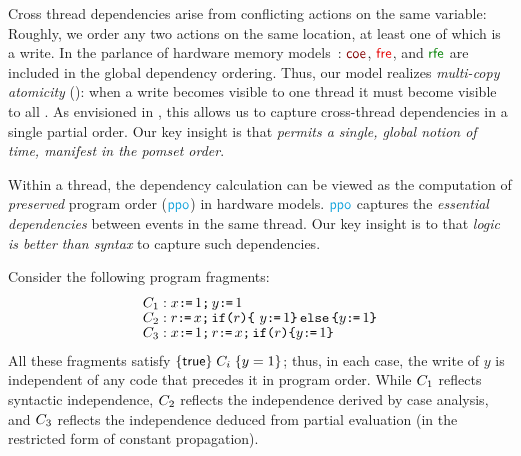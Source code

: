 Cross thread dependencies arise from conflicting actions on the same
variable: Roughly, we order any two actions on the same location, at least
one of which is a write.  In the parlance of hardware memory
models~\citep{alglave}: $\rcoe$, $\rfre$, and $\rrfex$ are included in the
global dependency ordering.  Thus, our model realizes \emph{multi-copy
  atomicity} (\mca): when a write becomes visible to one thread it must
become visible to all
\citep{DBLP:journals/pacmpl/PulteFDFSS18}.  As envisioned in
\cite[]{AlglaveThesis}, this allows us to capture cross-thread
dependencies in a single partial order.  Our key insight is that \emph{\mca{}
  permits a single, global notion of time, manifest in the pomset order}.
  

Within a thread, the dependency calculation can be viewed as the computation
of \emph{preserved} program order ($\rppo$) in hardware models.  $\rppo$
captures the \emph{essential dependencies} between events in the same thread.
Our key insight is to that \emph{logic is better than syntax} to capture such
dependencies.

Consider the following program fragments: \begingroup \allowdisplaybreaks
\begin{align*}
  & C_1: x \texttt{:}\mkern-1mu\texttt{=}\, 1 \texttt{;}\,\allowbreak y \texttt{:}\mkern-1mu\texttt{=}\, 1
  \\[-1ex] & C_2: r \texttt{:}\mkern-1mu\texttt{=}\, x \texttt{;}\,\allowbreak \texttt{if}\allowbreak\texttt{(}r\texttt{)} \allowbreak\texttt{\{}\ y \texttt{:}\mkern-1mu\texttt{=}\, 1 \texttt{\}}\,\allowbreak\texttt{else}\allowbreak\,\texttt{\{} y \texttt{:}\mkern-1mu\texttt{=}\, 1  \texttt{\}}
  \\[-1ex] & C_3: x \texttt{:}\mkern-1mu\texttt{=}\, 1 \texttt{;}\,\allowbreak r \texttt{:}\mkern-1mu\texttt{=}\, x \texttt{;}\,\allowbreak \texttt{if}\allowbreak\texttt{(}r\texttt{)} \allowbreak\texttt{\{} y \texttt{:}\mkern-1mu\texttt{=}\, 1 \texttt{\}}
\end{align*}
\endgroup
All these fragments satisfy $\{\mathsf{true}\}\allowbreak\;C_i\;\allowbreak\{y =1\}$; thus, in each
case, the write of $y$ is independent of any code that precedes it in program
order. While $C_1$ reflects syntactic independence, $C_2$ reflects
the independence derived by case analysis, and $C_3$ reflects the
independence deduced from partial evaluation (in the restricted form of
constant propagation).


